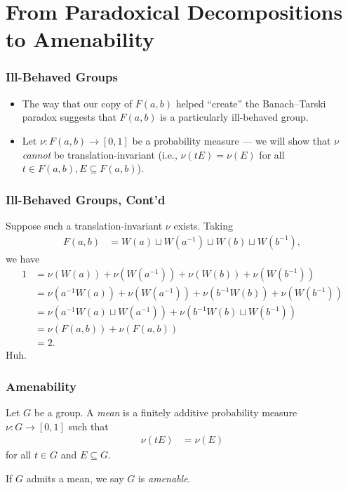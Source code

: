 \documentclass{beamer-custom}
\begin{document}
\section{From Paradoxical Decompositions to Amenability}%
\begin{frame}
  \frametitle{Ill-Behaved Groups}
  \begin{itemize}
    \item The way that our copy of $F(a,b)$ helped ``create'' the Banach--Tarski paradox suggests that $F(a,b)$ is a particularly ill-behaved group.
    \item Let $\nu\colon F(a,b)\rightarrow [0,1]$ be a probability measure --- we will show that $\nu$ \textit{cannot} be translation-invariant (i.e., $\nu\left( tE \right) = \nu\left( E \right)$ for all $t\in F(a,b),E\subseteq F(a,b)$).
  \end{itemize}
\end{frame}
\begin{frame}
  \frametitle{Ill-Behaved Groups, Cont'd}
  Suppose such a translation-invariant $\nu$ exists. Taking
  \begin{align*}
    F(a,b) &= W(a)\sqcup W\left( a^{-1} \right) \sqcup W\left( b \right) \sqcup W\left( b^{-1} \right),
  \end{align*}
  we have
  \begin{align*}
    1 &= \nu\left( W\left( a \right) \right) + \nu\left( W\left( a^{-1} \right) \right) + \nu\left( W\left( b \right) \right) + \nu\left( W\left( b^{-1} \right) \right)\\
      &= \nu\left( a^{-1}W\left( a \right) \right) + \nu\left( W\left( a^{-1} \right) \right) + \nu\left( b^{-1}W\left( b \right) \right) + \nu\left( W\left( b^{-1} \right) \right)\\
      &= \nu\left( a^{-1}W\left( a \right)\sqcup W\left( a^{-1} \right) \right) + \nu\left( b^{-1}W\left( b \right) \sqcup W\left( b^{-1} \right) \right)\\
      &= \nu\left( F(a,b) \right) + \nu\left( F(a,b) \right)\\
      &= 2.
  \end{align*}\pause
  Huh.
\end{frame}
\begin{frame}
  \frametitle{Amenability}
  Let $G$ be a group. A \textit{mean} is a finitely additive probability measure $\nu\colon G\rightarrow [0,1]$ such that
  \begin{align*}
    \nu\left( tE \right) &= \nu\left( E \right)
  \end{align*}
  for all $t\in G$ and $E\subseteq G$.\newline

  If $G$ admits a mean, we say $G$ is \textit{amenable}.
\end{frame}
\end{document}
